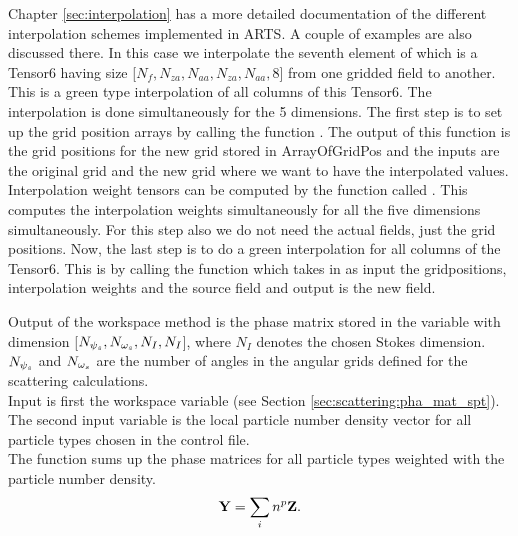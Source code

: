 Chapter \ref{sec:interpolation} has a more detailed documentation of
the different interpolation schemes implemented in ARTS. A couple of
examples are also discussed there.  In this case we interpolate the
seventh element of  which is a Tensor6 having
size [$N_{f}, N_{za}, N_{aa}, N_{za}, N_{aa}, 8$] from one gridded
field to another.  This is a green type interpolation of all columns
of this Tensor6.  The interpolation is done simultaneously for the 5
dimensions.  The first step is to set up the grid position arrays by
calling the function .  The output of this function
is the grid positions for the new grid stored in ArrayOfGridPos and
the inputs are the original grid and the new grid where we want to
have the interpolated values. Interpolation weight tensors can be
computed by the function called .  This
computes the interpolation weights simultaneously for all the five
dimensions simultaneously. For this step also we do not need the
actual fields, just the grid positions. Now, the last step is to do a
green interpolation for all columns of the Tensor6.  This is by
calling the function  which takes in as input the
gridpositions, interpolation weights and the source field and output
is the new field.

\label{sec:scattering:tot_pha_mat}

\label{sec:scattering:pha_mat}

Output of the workspace method  is the phase
matrix stored in the variable  with dimension
[$N_{{\psi_s}}, N_{{\omega_s}}, N_{I}, N_{I}$], where $N_{I}$ denotes the
chosen Stokes dimension.  $N_{{\psi_s}}$ and $N_{{\omega_s}}$ are the number
of angles in the angular grids defined for
the scattering calculations.\\
Input is first the workspace variable  (see
Section \ref{sec:scattering:pha_mat_spt}). The second input variable
is the local particle number density vector  for
all
particle types chosen in the control file.\\
The function sums up the phase matrices for all particle types
weighted with the particle number density.
\begin{eqnarray}
{\bf Y} = \sum_i{n^p{\bf Z}}.
\end{eqnarray}

